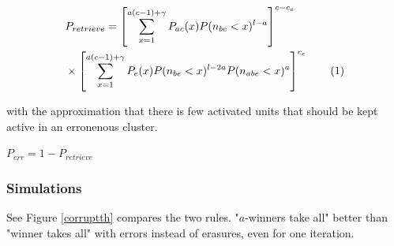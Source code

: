 \documentclass[english,11pt,twocolumn]{article}
\newcommand\numberthis{\addtocounter{equation}{1}\tag{\theequation}}
\theoremstyle{definition}
\begin{document}
		\begin{align*}
	&P_{retrieve} = \left [ \sum_{x = 1}^{a(c-1) + \gamma} P_{ac}(x) P(n_{bc} < x)^{l-a} \right ]^{c - c_e}\\ 
	 &\times \left [ \sum_{x = 1}^{a(c-1) +\gamma} P_e(x) P(n_{be} < x)^{l-2a} P(n_{abe} < x)^a \right ]^{c_e} \numberthis \label{from_err_th}
	\end{align*}
	
	with the approximation that there is few activated units that should be kept active in an erronenous cluster.

	
	$P_{err} = 1 - P_{retrieve}$	

	
	
	\subsubsection{Simulations}
	See Figure \ref{corruptth} compares the two rules.
	"$a$-winners take all" better than "winner takes all" with errors instead of erasures, even for one iteration.
	
\end{document}
